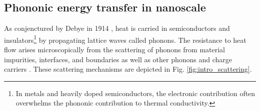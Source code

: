 



\subsection{Phononic energy transfer in nanoscale}
\label{sec:intro_vib}



As conjenctured by Debye in 1914 \cite{}, heat is carried in semiconductors and insulators\footnote{In metals and heavily doped semiconductors, the electronic contribution often overwhelms the phononic contribution to thermal conductivity.} by propagating lattice waves called phonons. The resistance to heat flow arises microscopically from the scattering of phonons from material impurities, interfaces, and boundaries as well as other phonons and charge carriers \cite{peierls29,ziman}. These scattering mechanisms are depicted in Fig. \ref{fig:intro_scattering}. 

